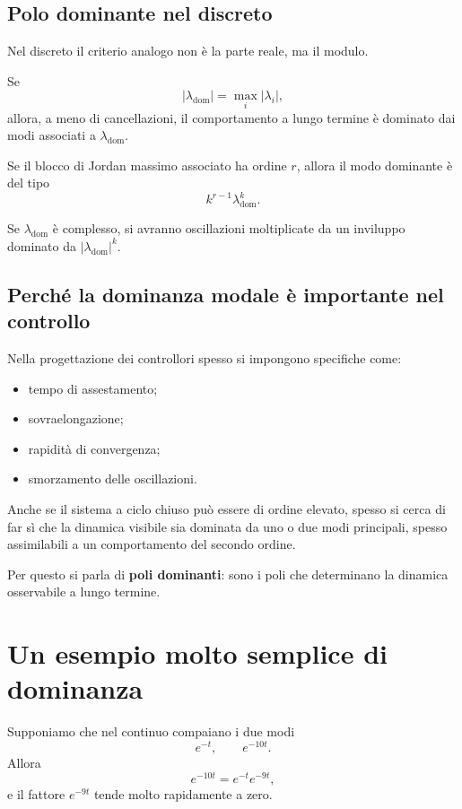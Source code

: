 \subsection{Polo dominante nel discreto}

Nel discreto il criterio analogo non è la parte reale, ma il modulo.

Se
\[
|\lambda_{\mathrm{dom}}|=\max_i |\lambda_i|,
\]
allora, a meno di cancellazioni, il comportamento a lungo termine è dominato dai modi associati a $\lambda_{\mathrm{dom}}$.

Se il blocco di Jordan massimo associato ha ordine $r$, allora il modo dominante è del tipo
\begin{equation}
k^{r-1}\lambda_{\mathrm{dom}}^k.
\label{eq:L10_dom_DT}
\end{equation}

Se $\lambda_{\mathrm{dom}}$ è complesso, si avranno oscillazioni moltiplicate da un inviluppo dominato da $|\lambda_{\mathrm{dom}}|^k$.

\subsection{Perché la dominanza modale è importante nel controllo}

Nella progettazione dei controllori spesso si impongono specifiche come:
\begin{itemize}
    \item tempo di assestamento;
    \item sovraelongazione;
    \item rapidità di convergenza;
    \item smorzamento delle oscillazioni.
\end{itemize}

Anche se il sistema a ciclo chiuso può essere di ordine elevato, spesso si cerca di far sì che la dinamica visibile sia dominata da uno o due modi principali, spesso assimilabili a un comportamento del secondo ordine.

Per questo si parla di \textbf{poli dominanti}: sono i poli che determinano la dinamica osservabile a lungo termine.

\section{Un esempio molto semplice di dominanza}

Supponiamo che nel continuo compaiano i due modi
\[
e^{-t}, \qquad e^{-10t}.
\]
Allora
\[
e^{-10t}=e^{-t}e^{-9t},
\]
e il fattore $e^{-9t}$ tende molto rapidamente a zero.

